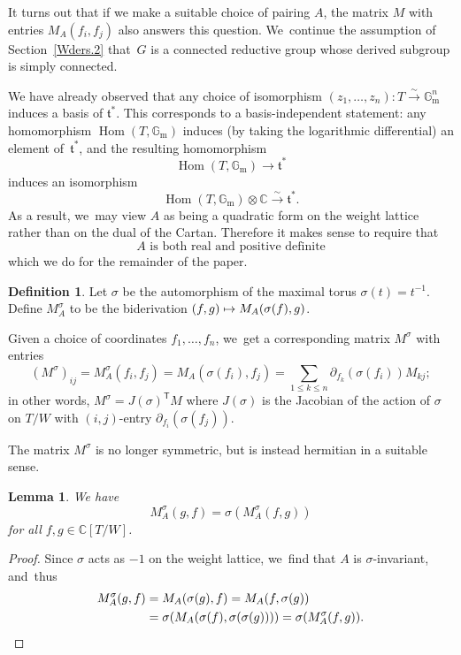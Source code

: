 \documentclass[JEP,XML,SOM,Unicode,NoFloatCountersInSection,published]{cedram}
\newcommand\mto{\mathchoice{\longmapsto}{\mapsto}{\mapsto}{\mapsto}}
\newtheorem{lem}[equation]{Lemma}
\theoremstyle{definition}
\newtheorem{defn}[equation]{Definition}
\let\:\colon
\newcommand{\mft}{\mathfrak{t}}
\newcommand{\trans}{\mathsf{T}}
\newcommand{\C}{\mathbb{C}}
\newcommand{\Gm}{\mathbb{G}_{\mathrm{m}}}
\DeclareMathOperator{\Hom}{Hom}
\begin{document}
It turns out that if we make a suitable choice of pairing $A$, the matrix
$M$ with entries $M_A(f_i,f_j)$ also answers this question. We~continue
the assumption of Section~\ref{Wders.2} that~$G$ is a connected reductive group
whose derived subgroup is simply connected.

We have already observed that any choice of isomorphism
$(z_1,\dots,z_n)\:T\xrightarrow{\sim} \Gm^n$ induces a basis of $\mft^*$. This
corresponds to a basis-independent statement: any homomorphism
$\Hom(T,\Gm)$ induces (by taking the logarithmic differential) an element
of~$\mft^*$, and the resulting homomorphism
\[
\Hom(T,\Gm)\to \mft^*
\]
induces an isomorphism
\[
\Hom(T,\Gm)\otimes \C\xrightarrow{\sim} \mft^*.
\]
As a result, we~may view $A$ as being a quadratic form on the weight lattice
rather than on the dual of the Cartan. Therefore it makes sense to require that
\begin{equation} \label{A.hyp}
\text{$A$ is both real and positive definite}
\end{equation}
which we do for the remainder of the paper.

\begin{defn} \label{Msig.def}
Let $\sigma$ be the automorphism of the maximal torus
$\sigma(t)=t^{-1}$. Define $M_A^\sigma$ to be the biderivation $(f,g)\mto
M_A(\sigma(f),g)$.

Given a choice of coordinates $f_1,\dots,f_n$, we~get a
corresponding matrix $M^\sigma$ with entries
\[
(M^\sigma)_{ij} = M^\sigma_A(f_i,f_j) = M_A(\sigma(f_i),f_j)
=
\sum_{1\le k\le n} \partial_{f_k}(\sigma(f_i)) M_{kj};
\]
in other words, $M^\sigma=J(\sigma)^\trans M$ where $J(\sigma)$ is the
Jacobian of the action of $\sigma$ on $T/W$ with $(i,j)$-entry $\partial_{f_i}(\sigma(f_j))$.
\end{defn}

The matrix $M^\sigma$ is no longer symmetric, but is instead hermitian in a suitable sense.

\begin{lem} \label{Msig.herm}
We have
\[
M^\sigma_A(g,f) = \sigma(M^\sigma_A(f,g))
\]
for all $f, g \in \C[T/W]$.
\end{lem}

\begin{proof}
Since $\sigma$ acts as $-1$ on the weight lattice, we~find that $A$ is
$\sigma$-invariant, and~thus
\begin{align*}
M^\sigma_A(g,f)
& =
M_A(\sigma(g),f)
=
M_A(f,\sigma(g)) \\
&=
\sigma(M_A(\sigma(f),\sigma(\sigma(g))))
=
\sigma(M^\sigma_A(f,g)).\qedhere
\end{align*}
\end{proof}
\end{document}
